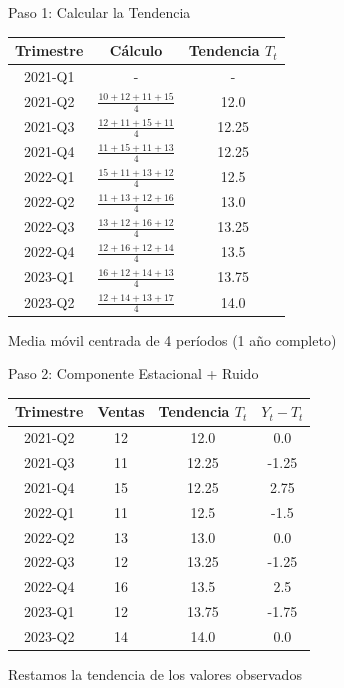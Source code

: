 \documentclass{beamer}
\begin{document}
\begin{frame}{Paso 1: Calcular la Tendencia}
    \begin{center}
        \small
        \begin{tabular}{ccc}
            \toprule
            Trimestre & Cálculo & Tendencia $T_t$ \\
            \midrule
            2021-Q1 & - & - \\
            2021-Q2 & $\frac{10 + 12 + 11 + 15}{4}$ & 12.0 \\
            2021-Q3 & $\frac{12 + 11 + 15 + 11}{4}$ & 12.25 \\
            2021-Q4 & $\frac{11 + 15 + 11 + 13}{4}$ & 12.25 \\
            2022-Q1 & $\frac{15 + 11 + 13 + 12}{4}$ & 12.5 \\
            2022-Q2 & $\frac{11 + 13 + 12 + 16}{4}$ & 13.0 \\
            2022-Q3 & $\frac{13 + 12 + 16 + 12}{4}$ & 13.25 \\
            2022-Q4 & $\frac{12 + 16 + 12 + 14}{4}$ & 13.5 \\
            2023-Q1 & $\frac{16 + 12 + 14 + 13}{4}$ & 13.75 \\
            2023-Q2 & $\frac{12 + 14 + 13 + 17}{4}$ & 14.0 \\
            \bottomrule
        \end{tabular}
    \end{center}
    
    \vspace{0.3cm}
    
    Media móvil centrada de 4 períodos (1 año completo)
\end{frame}

\begin{frame}{Paso 2: Componente Estacional + Ruido}
    \begin{center}
        \small
        \begin{tabular}{cccc}
            \toprule
            Trimestre & Ventas & Tendencia $T_t$ & $Y_t - T_t$ \\
            \midrule
            2021-Q2 & 12 & 12.0 & 0.0 \\
            2021-Q3 & 11 & 12.25 & -1.25 \\
            2021-Q4 & 15 & 12.25 & 2.75 \\
            2022-Q1 & 11 & 12.5 & -1.5 \\
            2022-Q2 & 13 & 13.0 & 0.0 \\
            2022-Q3 & 12 & 13.25 & -1.25 \\
            2022-Q4 & 16 & 13.5 & 2.5 \\
            2023-Q1 & 12 & 13.75 & -1.75 \\
            2023-Q2 & 14 & 14.0 & 0.0 \\
            \bottomrule
        \end{tabular}
    \end{center}
    
    \vspace{0.3cm}
    
    Restamos la tendencia de los valores observados
\end{frame}
\end{document}
